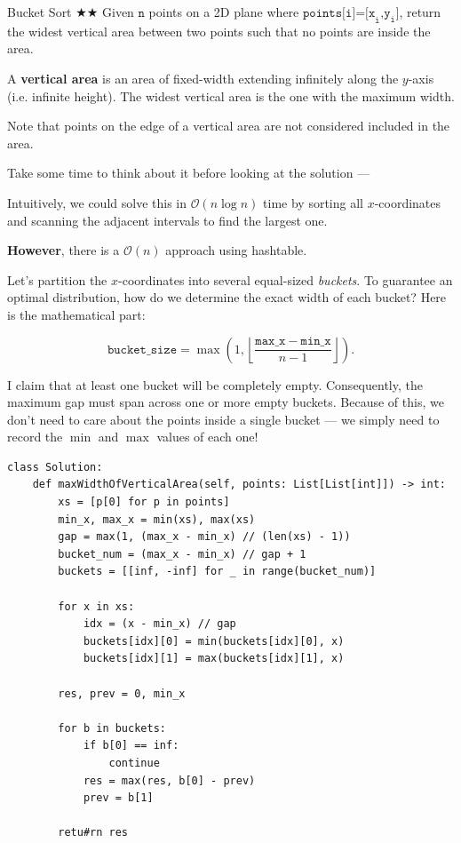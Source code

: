 \documentclass{article}
\begin{document}
\vspace{2em}


\begin{Question}{Bucket Sort $\bigstar\bigstar$}
Given $\texttt{n}$ points on a 2D plane where $\texttt{points[i]=[x}_{\texttt{i}}\texttt{,y}_{\texttt{i}}\texttt{]}$, return the widest vertical area between two points such that no points are inside the area.

A \textbf{vertical area} is an area of fixed-width extending infinitely along the $y$-axis (i.e. infinite height). The widest vertical area is the one with the maximum width.

Note that points on the edge of a vertical area are not considered included in the area.
\end{Question}

Take some time to think about it before looking at the solution --- 

Intuitively, we could solve this in $\mathcal O(n\log n)$ time by sorting all $x$-coordinates and scanning the adjacent intervals to find the largest one.

\textbf{However}, there is a $\mathcal O(n)$ approach using hashtable.

Let's partition the $x$-coordinates into several equal-sized \emph{buckets}. To guarantee an optimal distribution, how do we determine the exact width of each bucket? Here is the mathematical part:

$$
\texttt{bucket}\_\texttt{size} = \max\left(1, \left\lfloor\frac{\texttt{max}\_\texttt{x} - \texttt{min}\_\texttt{x}}{n - 1}\right\rfloor\right).
$$

I claim that at least one bucket will be completely empty. Consequently, the maximum gap must span across one or more empty buckets. Because of this, we don't need to care about the points inside a single bucket --- we simply need to record the $\min$ and $\max$ values of each one!

\begin{lstlisting}[style=python]
class Solution:
    def maxWidthOfVerticalArea(self, points: List[List[int]]) -> int:
        xs = [p[0] for p in points]
        min_x, max_x = min(xs), max(xs)
        gap = max(1, (max_x - min_x) // (len(xs) - 1))
        bucket_num = (max_x - min_x) // gap + 1
        buckets = [[inf, -inf] for _ in range(bucket_num)]
        
        for x in xs:
            idx = (x - min_x) // gap
            buckets[idx][0] = min(buckets[idx][0], x)
            buckets[idx][1] = max(buckets[idx][1], x)
            
        res, prev = 0, min_x
        
        for b in buckets:
            if b[0] == inf:
                continue
            res = max(res, b[0] - prev)
            prev = b[1]
            
        retu#rn res
\end{lstlisting}
\end{document}
